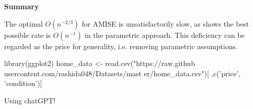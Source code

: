 \documentclass[19pt,landscape]{article}
\begin{document}
\newpage
{\LARGE\centerline{\textbf{Summary}}}
\vskip25pt
\begin{minipage}{.9\textwidth}
    \Large 
    The optimal $O(n^{-2/3})$ for AMISE is unsatisfactorily slow, as \cite{boydsteele78} shows the best possible rate is $O(n^{-1})$ in the parametric approach. This deficiency can be regarded as the price for generality, i.e. removing parametric assumptions.  

    \begin{Sinput}
        library(ggplot2)
        home_data <- read.csv("https://raw.github
        usercontent.com/rashida048/Datasets/mast
        er/home_data.csv")[ ,c('price', 'condition')]
    \end{Sinput}
    \vskip 10pt
    {\huge Using chatGPT!}
\end{minipage}








\end{document}
